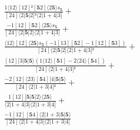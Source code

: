 \documentclass[varwidth, border=5pt]{standalone}
\begin{document}
\begin{my}
$\begin{gathered}
\scriptscriptstyle\frac{1⟨12⟩[12]²[𝟓2]⟨2𝟓⟩s_{𝟓}}{[24]⟨2|𝟓|2]²⟨2|1+4|3]} +\\
\scriptscriptstyle\frac{-1[12][𝟓2]⟨2𝟓⟩s_{𝟓}}{[24]⟨2|𝟓|2]⟨2|1+4|3]} +\\
\scriptscriptstyle\frac{⟨12⟩[12]⟨2𝟓⟩s_{𝟓}(-1[13][𝟓2]-1[12][𝟓3])}{[24]⟨2|𝟓|2]⟨2|1+4|3]²} +\\
\scriptscriptstyle\frac{[12][3|𝟓|𝟓⟩(1⟨12⟩[𝟓1]-2⟨24⟩[𝟓4])}{[24]⟨2|1+4|3]²} +\\
\scriptscriptstyle\frac{-2[12]⟨23⟩[𝟓4][4|𝟓|𝟓⟩}{[24]⟨2|1+3|4]²} +\\
\scriptscriptstyle\frac{1[12][𝟓|𝟓|2⟩⟨2𝟓⟩}{⟨2|1+4|3]⟨2|1+3|4]} +\\
\scriptscriptstyle\frac{-1[12][𝟓4]⟨2|1+3|𝟓|𝟓⟩}{[24]⟨2|1+4|3]⟨2|1+3|4]} \phantom{+}
\end{gathered}$
\end{my}
\end{document}
